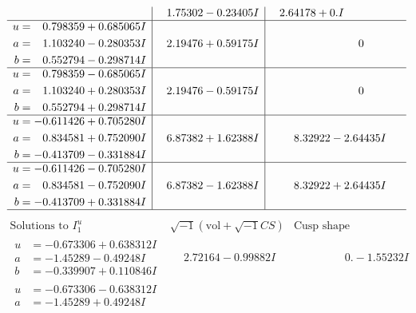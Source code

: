 \documentclass[1p]{elsarticle_modified}
\theoremstyle{definition}
\newcommand{\I}{\sqrt{-1}}
\begin{document}
$$\begin{array}{c|c|c}
 & \phantom{-}1.75302 - 0.23405 I & \phantom{-}2.64178 + 0. I\phantom{ +0.000000I} \\ \hline\begin{aligned}
u &= \phantom{-}0.798359 + 0.685065 I \\
a &= \phantom{-}1.103240 - 0.280353 I \\
b &= \phantom{-}0.552794 - 0.298714 I\end{aligned}
 & \phantom{-}2.19476 + 0.59175 I & \phantom{-0.000000 } 0 \\ \hline\begin{aligned}
u &= \phantom{-}0.798359 - 0.685065 I \\
a &= \phantom{-}1.103240 + 0.280353 I \\
b &= \phantom{-}0.552794 + 0.298714 I\end{aligned}
 & \phantom{-}2.19476 - 0.59175 I & \phantom{-0.000000 } 0 \\ \hline\begin{aligned}
u &= -0.611426 + 0.705280 I \\
a &= \phantom{-}0.834581 + 0.752090 I \\
b &= -0.413709 - 0.331884 I\end{aligned}
 & \phantom{-}6.87382 + 1.62388 I & \phantom{-}8.32922 - 2.64435 I \\ \hline\begin{aligned}
u &= -0.611426 - 0.705280 I \\
a &= \phantom{-}0.834581 - 0.752090 I \\
b &= -0.413709 + 0.331884 I\end{aligned}
 & \phantom{-}6.87382 - 1.62388 I & \phantom{-}8.32922 + 2.64435 I\\
 \hline 
 \end{array}$$\newpage$$\begin{array}{c|c|c}  
\text{Solutions to }I^u_{1}& \I (\text{vol} + \sqrt{-1}CS) & \text{Cusp shape}\\
 \hline 
\begin{aligned}
u &= -0.673306 + 0.638312 I \\
a &= -1.45289 - 0.49248 I \\
b &= -0.339907 + 0.110846 I\end{aligned}
 & \phantom{-}2.72164 - 0.99882 I & \phantom{-0.000000 } 0. - 1.55232 I \\ \hline\begin{aligned}
u &= -0.673306 - 0.638312 I \\
a &= -1.45289 + 0.49248 I \\

\end{aligned}
\end{array}$$
\end{document}
